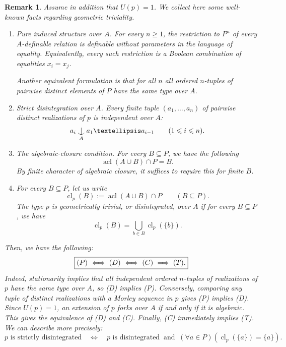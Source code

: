 \documentclass[10pt,a4paper]{amsart}
\newtheorem{remark}[theorem]{Remark}
\def\Ind#1#2{#1\setbox0=\hbox{$#1x$}\kern\wd0\hbox to
  0pt{\hss$#1\mid$\hss} \lower.9\ht0\hbox to
  0pt{\hss$#1\smile$\hss}\kern\wd0}
\def\ind{\mathop{\mathpalette\Ind{}}}
\begin{document}
\begin{remark}\label{PDCT}
Assume in addition that $U(p)=1$. We collect here some well-known facts regarding geometric triviality.
\begin{enumerate}
\item[(P)]
\emph{Pure induced structure over $A$.}
For every $n\geqslant 1$, the restriction to $P^n$ of every $A$-definable
relation is definable without parameters in the language of equality.
Equivalently, every such restriction is a Boolean combination of
equalities $x_i=x_j$.

Another equivalent formulation is that for all $n$ all ordered $n$-tuples of pairwise distinct elements of
$P$ have the same type over $A$.

\item[(D)]
\emph{Strict disintegration over $A$.}
Every finite tuple $(a_1,\ldots,a_n)$ of pairwise distinct realizations of $p$ is
independent over $A$:
\[
a_i\ind_A a_1\ldots a_{i-1}
\qquad (1\leqslant i\leqslant n).
\]

\item[(C)]
\emph{The algebraic-closure condition.} For every $B\subseteq P$, we have the following
\[
\operatorname{acl}(A\cup B)\cap P=B.
\]
By finite character of algebraic closure, it suffices to require this
for finite $B$.

\item[(T)] For every $B\subseteq P$, let us write
\[
\operatorname{cl}_p(B):=\operatorname{acl}(A\cup B)\cap P
\qquad(B\subseteq P).
\]
The type $p$ is \emph{geometrically trivial}, or \emph{disintegrated},
over $A$ if for every $B\subseteq P$, we have
\[
\operatorname{cl}_p(B)
=
\bigcup_{b\in B}\operatorname{cl}_p(\{b\}).
\]
\end{enumerate}
Then, we have the following:
\[
\boxed{\textnormal{(P)}
\ \Longleftrightarrow\
\textnormal{(D)}
\ \Longleftrightarrow\
\textnormal{(C)}\ \Longrightarrow\
\textnormal{(T)}.}
\]
Indeed, stationarity implies that all independent ordered
$n$-tuples of realizations of $p$ have the same type over $A$,
so \textnormal{(D)} implies \textnormal{(P)}. Conversely,
comparing any tuple of distinct realizations with a Morley
sequence in $p$ gives \textnormal{(P)} implies
\textnormal{(D)}. Since $U(p)=1$, an extension of $p$ forks
over $A$ if and only if it is algebraic. This gives the
equivalence of \textnormal{(D)} and \textnormal{(C)}.
Finally, \textnormal{(C)} immediately implies
\textnormal{(T)}.
We can describe more precisely:
\[
p\text{ is strictly disintegrated}
\quad\Longleftrightarrow\quad
p\text{ is disintegrated $\ $and $\ \left(\forall a\in P\right)\left(\operatorname{cl}_p(\{a\})=\{a\}\right)$}
.
\]
\end{remark}
\end{document}
